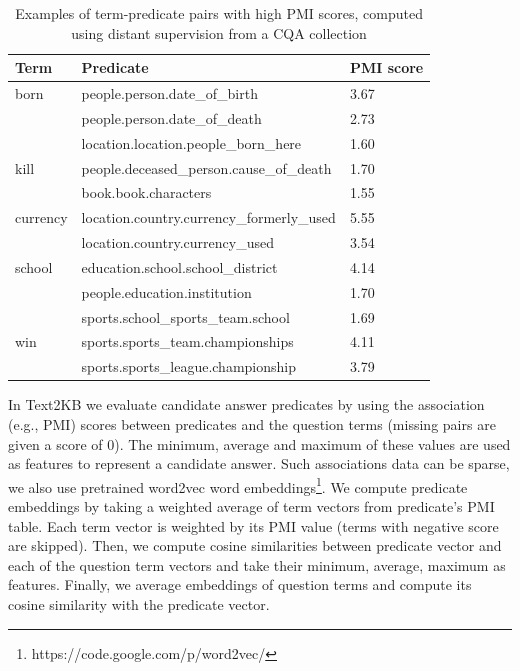 \begin{table}
\begin{tabular}{| p{1cm} | p{5.5cm} | p{0.75cm} |}
\hline
Term & Predicate & PMI score\\
\hline
born & people.person.date\_of\_birth & 3.67\\
 & people.person.date\_of\_death & 2.73\\
 & location.location.people\_born\_here & 1.60\\
\hline
kill & people.deceased\_person.cause\_of\_death & 1.70\\
& book.book.characters & 1.55\\
\hline
currency & location.country.currency\_formerly\_used & 5.55 \\
& location.country.currency\_used & 3.54 \\
\hline
school & education.school.school\_district & 4.14 \\
& people.education.institution & 1.70\\
& sports.school\_sports\_team.school & 1.69 \\
\hline
win & sports.sports\_team.championships & 4.11\\
& sports.sports\_league.championship & 3.79\\
\hline
\end{tabular}
\vspace{-3mm}
\caption{Examples of term-predicate pairs with high PMI scores, computed using distant supervision from a CQA collection}
\label{table:cqa_npmi}
\vspace{-2mm}
\end{table}

In Text2KB we evaluate candidate answer predicates by using the association (e.g., PMI) scores between predicates and the question terms (missing pairs are given a score of 0).
The minimum, average and maximum of these values are used as features to represent a candidate answer.
Such associations data can be sparse, we also use pretrained word2vec word embeddings\footnote{https://code.google.com/p/word2vec/}.
We compute predicate embeddings by taking a weighted average of term vectors from predicate's PMI table.
Each term vector is weighted by its PMI value (terms with negative score are skipped).
Then, we compute cosine similarities between predicate vector and each of the question term vectors and take their minimum, average, maximum as features.
Finally, we average embeddings of question terms and compute its cosine similarity with the predicate vector.

